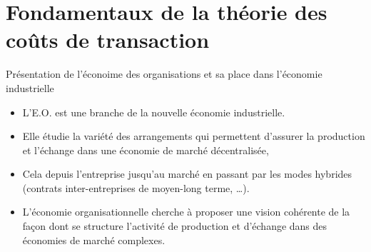 \section{Fondamentaux de la théorie des coûts de transaction}
\frame{\sectionpage}
\begin{frame}[allowframebreaks]{Présentation de l’éconoime des organisations et sa place dans l’économie industrielle }
    \begin{itemize}
    \item L'E.O. est une branche de la nouvelle économie industrielle.
    \item Elle étudie la variété des arrangements qui permettent d’assurer la production et l’échange dans une économie de marché décentralisée,
    \item Cela depuis l’entreprise jusqu’au marché en passant par les modes hybrides (contrats inter-entreprises de moyen-long terme, \ldots).
    \item L’économie organisationnelle cherche à proposer une vision cohérente de la façon dont se structure l’activité de production et d’échange dans des économies de marché complexes.
    \end{itemize}
\end{frame}
